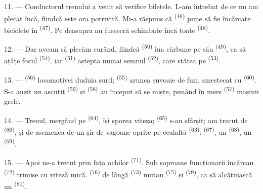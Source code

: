 11. --- Conductorul trenului a venit să verifice biletele. L-am întrebat de ce nu am
plecat încă, fiindcă este ora potrivită. Mi-a răspuns că 
\textsuperscript{(46)} pune să fie încărcate biciclete în  \textsuperscript{(47)}. Pe deasupra nu fuseseră schimbate încă toate
 \textsuperscript{(48)}.

12. --- Dar aveam să plecăm curând, fiindcă 
\textsuperscript{(50)} lua cărbune pe  său \textsuperscript{(49)},
ca să ațâțe focul  \textsuperscript{(54)}, iar
 \textsuperscript{(51)} aștepta numai semnul  \textsuperscript{(52)}, care stătea pe 
\textsuperscript{(53)}.

13. ---  \textsuperscript{(56)} locomotivei duduia surd;
 \textsuperscript{(55)} arunca șuvoaie de fum amestecat cu
 \textsuperscript{(60)}. S-a auzit un  ascuțit
\textsuperscript{(59)} și  \textsuperscript{(58)} au început să
se miște, punând în mers  \textsuperscript{(57)} mașinii grele.

\VUsaut{3.0mm}
\VUsaut{3.0mm}

14. --- Trenul, mergând pe  \textsuperscript{(64)}, își sporea viteza;
 \textsuperscript{(65)} s-au sfârșit; am trecut de
 \textsuperscript{(66)}, și de asemenea de un șir de vagoane oprite
pe  cealaltă \textsuperscript{(63)}: 
\textsuperscript{(67)}, un  \textsuperscript{(68)}, un
 \textsuperscript{(69)}.


15. --- Apoi ne-a trecut prin fața ochilor 
\textsuperscript{(71)}. Sub șoproane funcționarii încărcau 
\textsuperscript{(72)} trimise cu viteză mică. 
\textsuperscript{(76)} de lângă  \textsuperscript{(73)}
mutau  \textsuperscript{(75)} și 
\textsuperscript{(79)}, ca să alcătuiască un 
\textsuperscript{(80)}.

